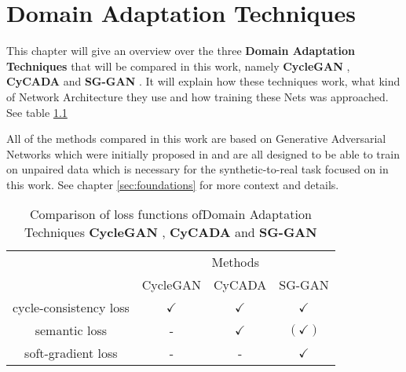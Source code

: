 \chapter{Domain Adaptation Techniques}
\label{sec:techniques}

This chapter will give an overview over the three \textbf{Domain Adaptation Techniques} that will be compared in this work, namely \textbf{CycleGAN} \cite{DBLP:journals/corr/ZhuPIE17}, \textbf{CyCADA} \cite{DBLP:journals/corr/abs-1711-03213} and \textbf{SG-GAN} \cite{DBLP:journals/corr/abs-1801-01726}. It will explain how these techniques work, what kind of Network Architecture they use and how training these Nets was approached. See table \ref{table:DA_comparison}

All of the methods compared in this work are based on Generative Adversarial Networks which were initially proposed in \cite{NIPS2014_5423} and are all designed to be able to train on unpaired data which is necessary for the synthetic-to-real task focused on in this work. See chapter \ref{sec:foundations} for more context and details.

\begin{table}
	\centering
	\begin{tabular}{|c|c|c|c|}
		\multicolumn{1}{c}{} & \multicolumn{3}{c}{Methods}\\
		\cline{2-4}
		\multicolumn{1}{c|}{} & CycleGAN & CyCADA & SG-GAN\\
		\hline
		cycle-consistency loss & $\checkmark$ & $\checkmark$ & $\checkmark$\\
		\hline
		semantic loss & - & $\checkmark$ & $(\checkmark)$\\
		\hline 
		soft-gradient loss & - & - & $\checkmark$\\
		\hline
	\end{tabular} 
	\caption{Comparison of loss functions ofDomain Adaptation Techniques \textbf{CycleGAN} \cite{DBLP:journals/corr/ZhuPIE17}, \textbf{CyCADA} \cite{DBLP:journals/corr/abs-1711-03213} and \textbf{SG-GAN} \cite{DBLP:journals/corr/abs-1801-01726}}
	\label{table:DA_comparison}
\end{table}

